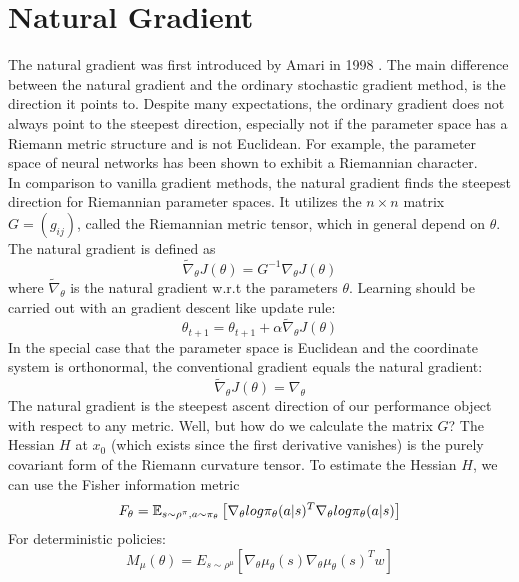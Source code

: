 \section{Natural Gradient}
The natural gradient was first introduced by Amari in 1998 \cite{amari1998natural}. The main difference between the natural gradient and the ordinary stochastic gradient method, is the direction it points to. Despite many expectations, the ordinary gradient does not always point to the steepest direction, especially not if the parameter space has a Riemann metric structure and is not Euclidean. For example, the parameter space of neural networks has been shown to exhibit a Riemannian character.\\
In comparison to vanilla gradient methods, the natural gradient finds the steepest direction for Riemannian parameter spaces. It utilizes the $n \times n$ matrix $G = (g_{ij})$, called the Riemannian metric tensor, which in general depend on $\theta$. The natural gradient is defined as
\begin{equation}
	\widetilde{\nabla}_{\theta} J(\theta) = G^{-1} \nabla_\theta J(\theta)
\end{equation}
where $\widetilde{\nabla}_{\theta}$ is the natural gradient w.r.t the parameters $\theta$.  Learning should be carried out with an gradient descent like update rule:
\begin{equation}
	\theta_{t+1} = \theta_{t+1} + \alpha \widetilde{\nabla}_{\theta} J(\theta)
\end{equation}
In the special case that the parameter space is Euclidean and the coordinate system is orthonormal, the conventional gradient equals the natural gradient:
\begin{equation}
	\widetilde{\nabla}_{\theta} J(\theta) = \nabla_{\theta}
\end{equation}
The natural gradient is the steepest ascent direction of our performance object with respect to any metric. Well, but how do we calculate the matrix $G$? The Hessian $H$ at $x_0$ (which exists since the first derivative vanishes) is the purely covariant form of the Riemann curvature tensor. To estimate the Hessian $H$, we can use the Fisher information metric 
\begin{equation}
	F_\theta=\operatorname{\mathbb{E}}_{s\sim\rho^{\pi},a\sim\pi_{\theta}}\left[\nabla_{\theta}log\pi_{\theta}(a|s)^{T}\nabla_{\theta}log\pi_{\theta}(a|s)\right]
\end{equation}
For deterministic policies: 
\begin{equation}
	M_{\mu}(\theta)=E_{s\sim\rho^{\mu}}[\nabla_{\theta}\mu_{\theta}(s)\nabla_{\theta}\mu_{\theta}(s)^{T}w]
\end{equation}
